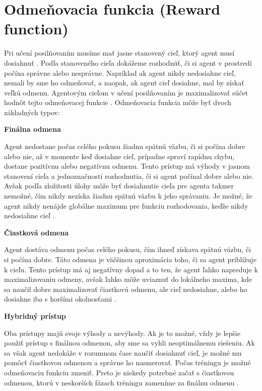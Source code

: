 \section{Odmeňovacia funkcia (Reward function)}

Pri učení posilňovaním musíme mať jasne stanovený cieľ, ktorý agent musí dosiahnuť \cite{reinforcment_in_real_time}. Podľa stanoveného cieľa dokážeme rozhodnúť, či si agent v prostredí počína správne alebo nesprávne. Napríklad ak agent nikdy nedosiahne cieľ, nemali by sme ho odmeňovať, a naopak, ak agent cieľ dosiahne, mal by získať veľkú odmenu. Agentovým cieľom v učení posilňovaním je maximalizovať súčet hodnôt tejto odmeňovacej funkcie \cite{reinforcment_in_real_time}. Odmeňovacia funkcia môže byť dvoch základných typov:

\textbf{Finálna odmena}

Agent nedostane počas celého pokusu žiadnu spätnú väzbu, či si počína dobre alebo nie, až v momente keď dosiahne cieľ, prípadne spraví rapídnu chybu, dostane pozitívnu alebo negatívnu odmenu. Tento prístup má výhody v jasnom stanovení cieľa a jednoznačnosti rozhodnutia, či si agent počínal dobre alebo nie. Avšak podľa zložitosti úlohy môže byť dosiahnutie cieľa pre agenta takmer nemožné, čím nikdy nezíska žiadnu spätnú väzbu k jeho správaniu. Je možné, že agent nikdy nenájde globálne maximum pre funkciu rozhodovania, keďže nikdy nedosiahne cieľ \cite{reinforcment_learning_intro}.

\textbf{Čiastková odmena}

Agent dostáva odmenu počas celého pokusu, čím ihneď získava spätnú väzbu, či si počína dobre. Táto odmena je väčšinou aproximácia toho, či sa agent priblížuje k cieľu. Tento prístup má aj negatívny dopad a to ten, že agent ľahko napreduje k maximalizovaniu odmeny, avšak ľahko môže uviaznuť do lokálneho maxima, kde sa naučil dobre maximalizovať čiastkovú odmenu, ale cieľ nedosiahne, alebo ho dosiahne iba s horšími okolnosťami \cite{reinforcment_learning_intro}.


\textbf{Hybridný prístup}

Oba prístupy majú svoje výhody a nevýhody. Ak je to možné, vždy je lepšie použiť prístup s finálnou odmenou, aby sme sa vyhli neoptimálnemu riešeniu. Ak sa však agent nedokáže v rozumnom čase naučiť dosiahnuť cieľ, je možné mu pomôcť čiastkovou odmenou a správne ho nasmerovať. Počas tréningu je možné odmeňovaciu funkciu zmeniť. Preto je niekedy potrebné začať s čiastkovou odmenou, ktorú v neskorších fázach tréningu zameníme za finálnu odmenu \cite{reinforcment_learning_intro}.



